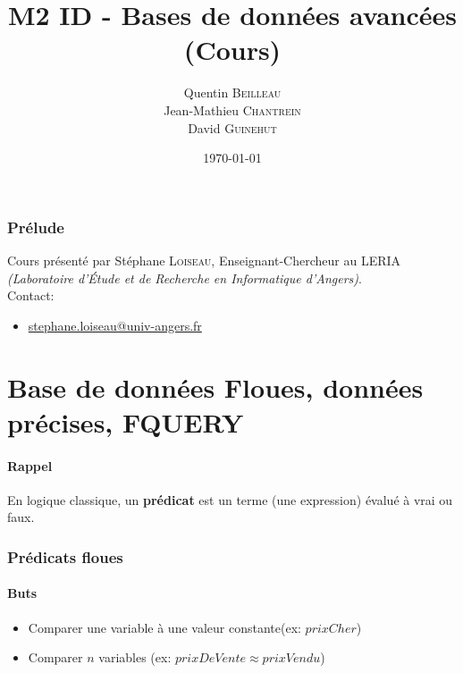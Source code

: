 \documentclass[a4paper,11pt]{article}
\title{M2 ID - Bases de données avancées \\ \normalsize (Cours)}
\author{Quentin \textsc{Beilleau} \\ Jean-Mathieu \textsc{Chantrein} \\ David \textsc{Guinehut}}
\date{\today}
\begin{document}
	\renewcommand{\headrulewidth}{0.001pt}
	
	\pagestyle{fancy}
	
	\maketitle

	\tableofcontents

\section*{Prélude}
Cours présenté par Stéphane \textsc{Loiseau}, Enseignant-Chercheur au LERIA \emph{(Laboratoire d’Étude et de Recherche en Informatique d'Angers)}.\\

Contact:
	\begin{itemize}
		\item[] \url{stephane.loiseau@univ-angers.fr} 
	\end{itemize}

\newpage
\part{Base de données Floues, données précises, FQUERY}

\subsection*{Rappel}
En logique classique, un \textbf{prédicat} est un terme (une expression) évalué à vrai ou faux.

\section{Prédicats floues}

\subsection{Buts}
\begin{itemize}
\item Comparer une variable à une valeur constante(ex: $prixCher$)
\item Comparer $n$ variables (ex: $prixDeVente \approx prixVendu$)
\end{itemize}
\end{document}
